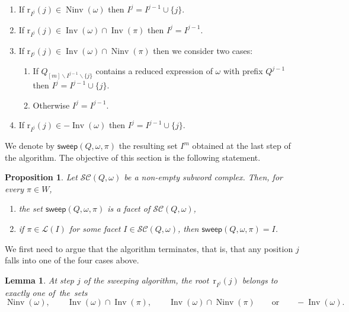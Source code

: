 \documentclass[reqno]{amsart}
\newtheorem{proposition}[theorem]{Proposition}
\newtheorem{lemma}[theorem]{Lemma}
\theoremstyle{definition}
\newcommand{\ssm}{\smallsetminus} %
\DeclareMathOperator{\Inv}{Inv} %
\DeclareMathOperator{\Ninv}{Ninv} %
\newcommand{\linearExtensions}{\mathcal{L}} %
\newcommand{\subwordComplex}{\mathcal{SC}} %
\newcommand{\rootFunction}[2]{\mathrm{r}_{#1}(#2)} %
\newcommand{\sweepingAlgorithm}{\mathsf{sweep}} %
\begin{document}
\begin{enumerate}[{Case} 1:]
    \item If $\rootFunction{I^j}{j}\in \Ninv(\omega)$ then 
    \(
    I^j=I^{j-1}\cup\{j\}.
    \) 
    \label{sweeping_case1}
    \item If $\rootFunction{I^j}{j}\in \Inv(\omega) \cap \Inv(\pi)$ then 
    \(
    I^j=I^{j-1}.
    \)
    \label{sweeping_case2}
    \item If $\rootFunction{I^j}{j}\in \Inv(\omega) \cap \Ninv(\pi)$ then we consider two cases: 
    \label{sweeping_case3} 
    \begin{enumerate}[\hspace{-1cm} (a)]
        \item If $Q_{[m]\ssm I^{j-1}\ssm \{j\}}$ contains a reduced expression of $\omega$ with prefix $Q^{j-1}$ then 
        \(
        {I^j=I^{j-1}\cup \{j\}}.
        \)~
        \label{sweeping_case3a}
        \item Otherwise
        \(
        I^j=I^{j-1}.
        \)
        \label{sweeping_case3b}
    \end{enumerate}
    \item If $\rootFunction{I^j}{j}\in -\Inv(\omega)$ then
    \(
    I^j=I^{j-1}\cup \{j\}.
    \)
    \label{sweeping_case4}
\end{enumerate}

We denote by $\sweepingAlgorithm(Q,\omega,\pi)$ the resulting set $I^m$ obtained at the last step of the algorithm.
The objective of this section is the following statement.

\begin{proposition}
\label{prop:sweeping}
Let $\subwordComplex(Q,\omega)$ be a non-empty subword complex. Then, for every $\pi \in W$, 
\begin{enumerate}
\item the set $\sweepingAlgorithm(Q,\omega,\pi)$ is a facet of $\subwordComplex(Q,\omega)$, \label{item:sweeping1}
\item if $\pi\in \linearExtensions(I)$ for some facet $I\in \subwordComplex(Q,\omega)$, then $\sweepingAlgorithm(Q,\omega,\pi) = I$. \label{item:sweeping2}
\end{enumerate}
\end{proposition}

We first need to argue that the algorithm terminates, that is, that any position $j$ falls into one of the four cases above.

\begin{lemma}
\label{lem:sweeping1}
At step $j$ of the sweeping algorithm, the root~$\rootFunction{I^j}{j}$ belongs to exactly one of~the~sets
\[
\Ninv(\omega),
\qquad
\Inv(\omega) \cap \Inv(\pi),
\qquad
\Inv(\omega) \cap \Ninv(\pi)
\qquad\text{or}\qquad
-\Inv(\omega).
\]
\end{lemma}
\end{document}
